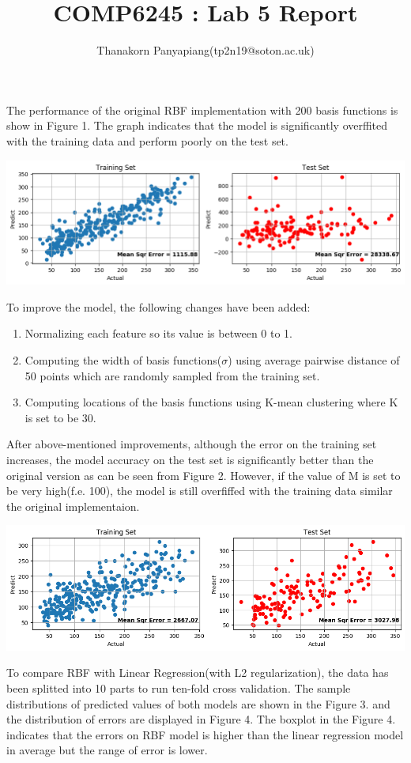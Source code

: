 \documentclass{article}
\title{COMP6245 : Lab 5 Report}
\author{Thanakorn Panyapiang(tp2n19@soton.ac.uk)}
\date{}
\begin{document}
\maketitle

The performance of the original RBF implementation with 200 basis functions is show in Figure 1. The graph indicates that the model is significantly overffited with the training data and perform poorly on the test set.

\includegraphics[scale=0.4]{rbf_original}

To improve the model, the following changes have been added:
\begin{enumerate}
\item Normalizing each feature so its value is between 0 to 1.
\item Computing the width of basis functions($\sigma$) using average pairwise distance of 50 points which are randomly sampled from the training set.
\item Computing locations of the basis functions using K-mean clustering where K is set to be 30.
\end{enumerate}

\indent After above-mentioned improvements, although the error on the training set increases, the model accuracy on the test set is significantly better than the original version as can be seen from Figure 2. However, if the value of M is set to be very high(f.e. 100), the model is still overfiffed with the training data similar the original implementaion.

\includegraphics[scale=0.4]{rbf_improved}

To compare RBF with Linear Regression(with L2 regularization), the data has been splitted into 10 parts to run ten-fold cross validation. The sample distributions of predicted values of both models are shown in the Figure 3. and the distribution of errors are displayed in Figure 4. The boxplot in the Figure 4. indicates that the errors on RBF model is higher than the linear regression model in average but the range of error is lower.
\end{document}
